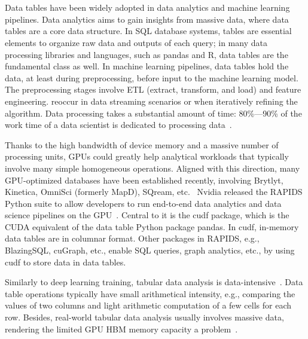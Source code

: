\section{}
\label{sec:future_tabular}
Data tables have been widely adopted in data analytics and machine learning pipelines. Data analytics aims to gain insights from massive data, where data tables are a core data structure. In SQL database systems, tables are essential elements to organize raw data and outputs of each query; in many data processing libraries and languages, such as pandas and R, data tables are the fundamental class as well. In machine learning pipelines, data tables hold the data, at least during preprocessing, before input to the machine learning model. The preprocessing stages involve ETL (extract, transform, and load) and feature engineering.  reoccur in data streaming scenarios or when iteratively refining the algorithm. Data processing takes a substantial amount of time: 80\%—90\% of the work time of a data scientist is dedicated to processing data~\cite{kaggle2017KaggleMachine, crowdflower2017DataScientist2017}. 

Thanks to the high bandwidth of device memory and a massive number of processing units, GPUs could greatly help analytical workloads that typically involve many simple homogeneous operations. Aligned with this direction, many GPU-optimized databases have been established recently, involving Brytlyt, Kinetica, OmniSci (formerly MapD), SQream, etc.~\cite{DoingRealityCheck2018} 
Nvidia released the RAPIDS Python suite to allow developers to run end-to-end data analytics and data science pipelines on the GPU~\cite{nvidiaRAPIDSGPUAcceleratedData2018}. Central to it is the cudf package, which is the CUDA equivalent of the data table Python package pandas. In cudf, in-memory data tables are in columnar format. Other packages in RAPIDS, e.g., BlazingSQL, cuGraph, etc., enable SQL queries, graph analytics, etc., by using cudf to store data in data tables. 

Similarly to deep learning training, tabular data analysis is data-intensive~\cite{caoGPUDatabaseSystems2023}. Data table operations typically have small arithmetical intensity, e.g., comparing the values of two columns and light arithmetic computation of a few cells for each row. Besides, real-world tabular data analysis usually involves massive data, rendering the limited GPU HBM memory capacity a problem~\cite{xiangyaoyuGPUDatabasesNew2024}.

